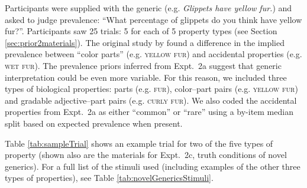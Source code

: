 \documentclass[10pt,letterpaper]{article}
\begin{document}
Participants were supplied with the generic (e.g. \emph{Glippets have yellow fur.}) and asked to judge prevalence: ``What percentage of glippets do you think have yellow fur?''. 
Participants saw 25 trials: 5 for each of 5 property types (see Section \ref{sec:prior2materials}).
The original study by \citeauthor{Cimpian2010} found a difference in the implied prevalence between ``color parts'' (e.g. \textsc{yellow fur}) and accidental properties (e.g. \textsc{wet fur}).
The prevalence priors inferred from Expt.~2a suggest that generic interpretation could be even more variable.
For this reason, we included three types of biological properties: parts (e.g. \textsc{fur}), color--part pairs (e.g. \textsc{yellow fur}) and gradable adjective--part pairs (e.g. \textsc{curly fur}). 
We also coded the accidental properties from Expt.~2a as either ``common'' or ``rare'' using a by-item median split based on expected prevalence when present.




 
Table \ref{tab:sampleTrial} shows an example trial for two of the five types of property (shown also are the materials for Expt.~2c, truth conditions of novel generics).
For a full list of the stimuli used (including examples of the other three types of properties), see Table \ref{tab:novelGenericsStimuli}.
\end{document}
